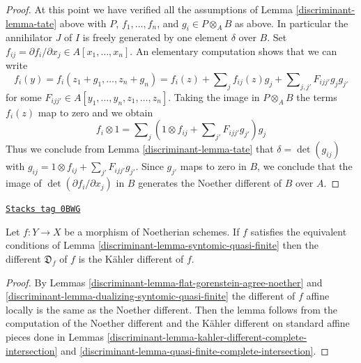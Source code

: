 \begin{proof}
\medskip\noindent
At this point we have verified all the assumptions of Lemma \ref{discriminant-lemma-tate}
above with $P$, $f_1, \ldots, f_n$, and $g_i \in P \otimes_A B$ as above.
In particular the annihilator $J$ of $I$ is freely generated by one
element $\delta$ over $B$.
Set $f_{ij} = \partial f_i/\partial x_j \in A[x_1, \ldots, x_n]$.
An elementary computation shows that we can write
$$
f_i(y) =
f_i(z_1 + g_1, \ldots, z_n + g_n) =
f_i(z) + \sum\nolimits_j f_{ij}(z) g_j +
\sum\nolimits_{j, j'} F_{ijj'}g_jg_{j'}
$$
for some $F_{ijj'} \in A[y_1, \ldots, y_n, z_1, \ldots, z_n]$.
Taking the image in $P \otimes_A B$ the terms $f_i(z)$ map to
zero and we obtain
$$
f_i \otimes 1 = \sum\nolimits_j
\left(1 \otimes f_{ij} + \sum\nolimits_{j'} F_{ijj'}g_{j'}\right)g_j
$$
Thus we conclude from Lemma \ref{discriminant-lemma-tate}
that $\delta = \det(g_{ij})$ with
$g_{ij} = 1 \otimes f_{ij} + \sum_{j'} F_{ijj'}g_{j'}$.
Since $g_{j'}$ maps to zero in $B$, we conclude
that the image of $\det(\partial f_i/\partial x_j)$ in $B$
generates the Noether different of $B$ over $A$.
\end{proof}

\begin{lemma}
\label{discriminant-lemma-different-syntomic-quasi-finite}
\href{https://stacks.math.columbia.edu/tag/0BWG}{\texttt{Stacks tag 0BWG}}

Let $f : Y \to X$ be a morphism of Noetherian schemes. If $f$
satisfies the equivalent conditions of Lemma \ref{discriminant-lemma-syntomic-quasi-finite}
then the different $\mathfrak{D}_f$ of $f$ is the K\"ahler different
of $f$.
\end{lemma}

\begin{proof}

By Lemmas \ref{discriminant-lemma-flat-gorenstein-agree-noether} and
\ref{discriminant-lemma-dualizing-syntomic-quasi-finite}
the different of $f$ affine locally is the same as the
Noether different. Then the lemma follows from the
computation of the Noether different and the K\"ahler
different on standard affine pieces done in
Lemmas \ref{discriminant-lemma-kahler-different-complete-intersection} and
\ref{discriminant-lemma-quasi-finite-complete-intersection}.
\end{proof}

